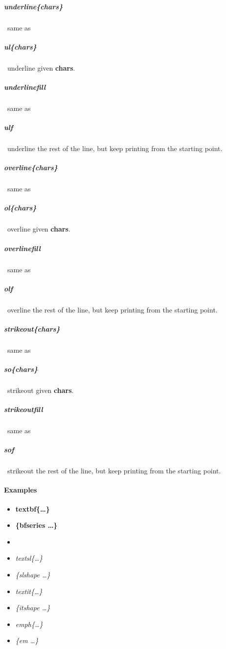 \documentclass[english,12pt,openany,letterpaper]{book}
\begin{document}
\subparagraph{\bs underline\{chars\}} \dash\ same as

\subparagraph{\tabspace\bs ul\{chars\}} \dash\ underline given \textbf{chars}.

\subparagraph{\bs underlinefill} \dash\ same as

\subparagraph{\tabspace\bs ulf} \dash\ underline the rest of the line, but keep printing from the starting point.

\skipline

\subparagraph{\bs overline\{chars\}} \dash\ same as

\subparagraph{\tabspace\bs ol\{chars\}} \dash\ overline given \textbf{chars}.

\subparagraph{\bs overlinefill} \dash\ same as

\subparagraph{\tabspace\bs olf} \dash\ overline the rest of the line, but keep printing from the starting point.

\skipline

\subparagraph{\bs strikeout\{chars\}} \dash\ same as

\subparagraph{\tabspace\bs so\{chars\}} \dash\ strikeout given \textbf{chars}.

\subparagraph{\bs strikeoutfill} \dash\ same as

\subparagraph{\tabspace\bs sof} \dash\ strikeout the rest of the line, but keep printing from the starting point.

\break

\paragraph{Examples}

\vspace*{-2ex}

\begin{multicols}{3}
\begin{itemize}
	\item \textbf{\bs textbf\{\ldots\}}
	\item {\bfseries \{\bs bfseries \ldots\}}
	\item {}
	\item \textsl{\bs textsl\{\ldots\}}
	\item {\slshape \{\bs slshape \ldots\}}
	\item \textit{\bs textit\{\ldots\}}
	\item {\itshape \{\bs itshape \ldots\}}
	\item \emph{\bs emph\{\ldots\}}
	\item {\em \{\bs em \ldots\}}
\end{itemize}
\end{multicols}
\end{document}
